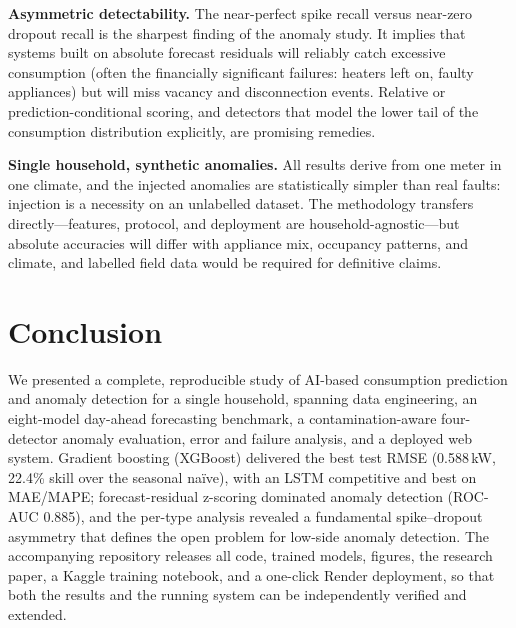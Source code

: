 \documentclass[10pt,a4paper]{article}
\begin{document}
\textbf{Asymmetric detectability.} The near-perfect spike recall versus
near-zero dropout recall is the sharpest finding of the anomaly study. It implies
that systems built on absolute forecast residuals will reliably catch excessive
consumption (often the financially significant failures: heaters left on, faulty
appliances) but will miss vacancy and disconnection events. Relative or
prediction-conditional scoring, and detectors that model the lower tail of the
consumption distribution explicitly, are promising remedies.

\textbf{Single household, synthetic anomalies.} All results derive from one meter in
one climate, and the injected anomalies are statistically simpler than real faults:
injection is a necessity on an unlabelled dataset. The methodology transfers
directly---features, protocol, and deployment are household-agnostic---but absolute
accuracies will differ with appliance mix, occupancy patterns, and climate, and
labelled field data would be required for definitive claims.

\section{Conclusion}\label{sec:conclusion}

We presented a complete, reproducible study of AI-based consumption prediction and
anomaly detection for a single household, spanning data engineering, an
eight-model day-ahead forecasting benchmark, a contamination-aware four-detector
anomaly evaluation, error and failure analysis, and a deployed web system. Gradient
boosting (XGBoost) delivered the best test RMSE (0.588\,kW, 22.4\% skill over the
seasonal na\"ive), with an LSTM competitive and best on MAE/MAPE; forecast-residual
z-scoring dominated anomaly detection (ROC-AUC 0.885), and the per-type analysis
revealed a fundamental spike--dropout asymmetry that defines the open problem for
low-side anomaly detection. The accompanying repository releases all code, trained
models, figures, the research paper, a Kaggle training notebook, and a one-click
Render deployment, so that both the results and the running system can be
independently verified and extended.

\setlength{\bibsep}{1.5pt plus 1pt}
\renewcommand{\bibfont}{\footnotesize}

\end{document}
